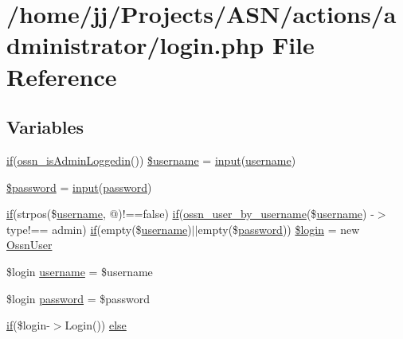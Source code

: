 \hypertarget{actions_2administrator_2login_8php}{}\section{/home/jj/\+Projects/\+A\+S\+N/actions/administrator/login.php File Reference}
\label{actions_2administrator_2login_8php}
\subsection*{Variables}
\begin{DoxyCompactItemize}
\item 
\hyperlink{jquery_8tokeninput_8js_ad8dd46a3cbc004569e34401e9e71771a}{if}(\hyperlink{ossn_8lib_8users_8php_abf45a4c659ffd196160e8173c2af1106}{ossn\+\_\+is\+Admin\+Loggedin}()) \hyperlink{actions_2administrator_2login_8php_af5c582607f73d1c406e2cbd407aef116}{\$username} = \hyperlink{ossn_8lib_8input_8php_a64ebee98b041c4f75f71ed3cd73cc8ed}{input}(\textquotesingle{}\hyperlink{actions_2account_8php_ac9b3768ccc688c2ff0811c50c107a02e}{username}\textquotesingle{})
\item 
\hyperlink{actions_2administrator_2login_8php_a607686ef9f99ea7c42f4f3dd3dbb2b0d}{\$password} = \hyperlink{ossn_8lib_8input_8php_a64ebee98b041c4f75f71ed3cd73cc8ed}{input}(\textquotesingle{}\hyperlink{actions_2account_8php_a3ef39d3ee8b2bcca6a288308549ccb44}{password}\textquotesingle{})
\item 
\hyperlink{jquery_8tokeninput_8js_ad8dd46a3cbc004569e34401e9e71771a}{if}(strpos(\$\hyperlink{actions_2account_8php_ac9b3768ccc688c2ff0811c50c107a02e}{username}, \textquotesingle{}@\textquotesingle{})!==false) \hyperlink{jquery_8tokeninput_8js_ad8dd46a3cbc004569e34401e9e71771a}{if}(\hyperlink{ossn_8lib_8users_8php_a77fdcb678aedd165af1f9f875645c864}{ossn\+\_\+user\+\_\+by\+\_\+username}(\$\hyperlink{actions_2account_8php_ac9b3768ccc688c2ff0811c50c107a02e}{username}) -\/$>$type!== \textquotesingle{}admin\textquotesingle{}) \hyperlink{jquery_8tokeninput_8js_ad8dd46a3cbc004569e34401e9e71771a}{if}(empty(\$\hyperlink{actions_2account_8php_ac9b3768ccc688c2ff0811c50c107a02e}{username})$\vert$$\vert$empty(\$\hyperlink{actions_2account_8php_a3ef39d3ee8b2bcca6a288308549ccb44}{password})) \hyperlink{actions_2administrator_2login_8php_a299d1072474bc26bde7ef4df4ac51f51}{\$login} = new \hyperlink{class_ossn_user}{Ossn\+User}
\item 
\$login \hyperlink{actions_2administrator_2login_8php_a5ae6e9dd2f76961089b9aa789ef054f5}{username} = \$username
\item 
\$login \hyperlink{actions_2administrator_2login_8php_a04cab294daa984a97618ae9c32c2e8e8}{password} = \$password
\item 
\hyperlink{jquery_8tokeninput_8js_ad8dd46a3cbc004569e34401e9e71771a}{if}(\$login-\/$>$Login()) \hyperlink{actions_2administrator_2login_8php_a514c4a3dcf615a7dd4fc6a15e5d1761b}{else}
\end{DoxyCompactItemize}


